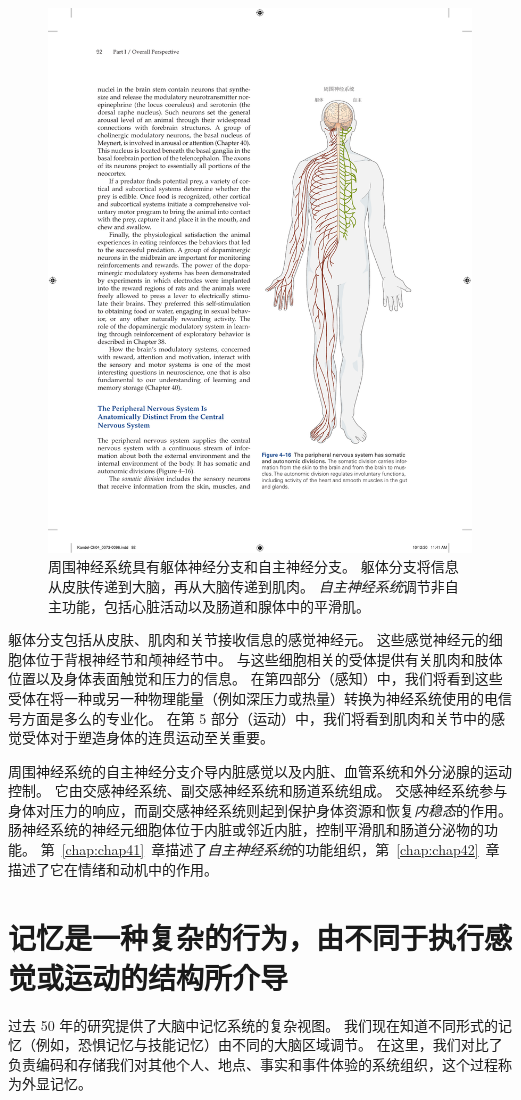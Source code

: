 \begin{figure}[htbp]
	\centering
	\includegraphics[width=0.55\linewidth]{chap04/fig_4_16}
	\caption{周围神经系统具有躯体神经分支和自主神经分支。
		躯体分支将信息从皮肤传递到大脑，再从大脑传递到肌肉。
		\textit{自主神经系统}调节非自主功能，包括心脏活动以及肠道和腺体中的平滑肌。}
	\label{fig:4_16}
\end{figure}


躯体分支包括从皮肤、肌肉和关节接收信息的感觉神经元。
这些感觉神经元的细胞体位于背根神经节和颅神经节中。 
与这些细胞相关的受体提供有关肌肉和肢体位置以及身体表面触觉和压力的信息。
在第四部分（感知）中，我们将看到这些受体在将一种或另一种物理能量（例如深压力或热量）转换为神经系统使用的电信号方面是多么的专业化。
在第 5 部分（运动）中，我们将看到肌肉和关节中的感觉受体对于塑造身体的连贯运动至关重要。


周围神经系统的自主神经分支介导内脏感觉以及内脏、血管系统和外分泌腺的运动控制。
它由交感神经系统、副交感神经系统和肠道系统组成。 
交感神经系统参与身体对压力的响应，而副交感神经系统则起到保护身体资源和恢复\textit{内稳态}的作用。
肠神经系统的神经元细胞体位于内脏或邻近内脏，控制平滑肌和肠道分泌物的功能。
第~\ref{chap:chap41}~章描述了\textit{自主神经系统}的功能组织，第~\ref{chap:chap42}~章描述了它在情绪和动机中的作用。



\section{记忆是一种复杂的行为，由不同于执行感觉或运动的结构所介导}

过去 50 年的研究提供了大脑中记忆系统的复杂视图。 
我们现在知道不同形式的记忆（例如，恐惧记忆与技能记忆）由不同的大脑区域调节。
在这里，我们对比了负责编码和存储我们对其他个人、地点、事实和事件体验的系统组织，这个过程称为外显记忆。


